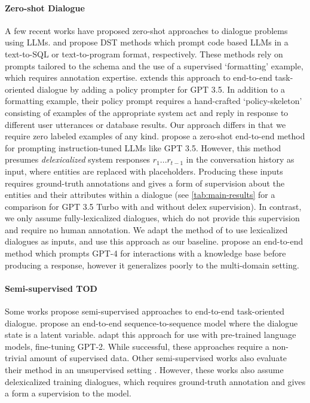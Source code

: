 \documentclass[11pt]{article}
\begin{document}
\paragraph{Zero-shot Dialogue} A few recent works have proposed zero-shot approaches to dialogue problems using LLMs. 
\citet{hu_-context_2022} and \cite{king-flanigan-2023-diverse} propose DST methods which prompt code based LLMs in a text-to-SQL or text-to-program format, respectively. 
These methods rely on prompts tailored to the schema and the use of a supervised `formatting' example, which requires annotation expertise. 
\citet{zhang-etal-2023-sgp} extends this approach to end-to-end task-oriented dialogue by adding a policy prompter for GPT 3.5. 
In addition to a formatting example, their policy prompt requires a hand-crafted `policy-skeleton' consisting of examples of the appropriate system act and reply in response to different user utterances or database results.
Our approach differs in that we require zero labeled examples of any kind. 
\citet{hudecek-dusek-2023-large} propose a zero-shot end-to-end method for prompting instruction-tuned LLMs like GPT 3.5.
However, this method presumes \textit{delexicalized} system responses $r_1 ... r_{t-1}$ in the conversation history as input, where entities are replaced with placeholders. 
Producing these inputs requires ground-truth annotations and gives a form of supervision about the entities and their attributes within a dialogue (see \autoref{tab:main-results} for a comparison for  GPT 3.5 Turbo with and without delex supervision).
In contrast, we only assume fully-lexicalized dialogues, which do not provide this supervision and require no human annotation.
We adapt the method of \citet{hudecek-dusek-2023-large} to use lexicalized dialogues as inputs, and use this approach as our baseline.
\citet{chung_instructtods_2023} propose an end-to-end method which prompts GPT-4 for interactions with a knowledge base before producing a response, however it generalizes poorly to the multi-domain setting.

\paragraph{Semi-supervised TOD} Some works propose semi-supervised approaches to end-to-end task-oriented dialogue. 
\citet{zhang_probabilistic_2020} propose an end-to-end sequence-to-sequence model where the dialogue state is a latent variable. 
\citet{liu_variational_2021} adapt this approach for use with pre-trained language models, fine-tuning GPT-2. 
While successful, these approaches require a non-trivial amount of supervised data.
Other semi-supervised works also evaluate their method in an unsupervised setting \cite{jin_explicit_2018, liu_unsupervised_2023}. 
However, these works also assume delexicalized training dialogues, which requires ground-truth annotation and gives a form a supervision to the model.
\end{document}

